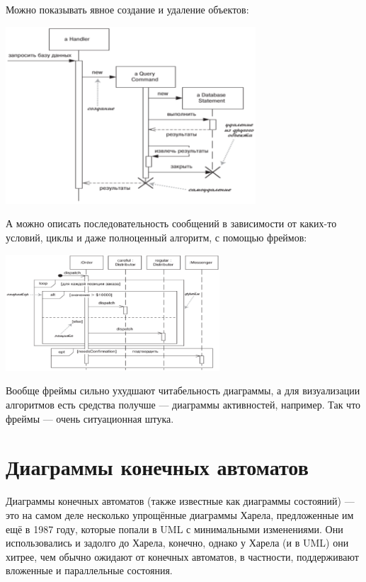 \documentclass{../mcstext}
\begin{document}
Можно показывать явное создание и удаление объектов:

\begin{center}
    \includegraphics[width=0.7\textwidth]{sequenceLifeCycle.png}
\end{center}

А можно описать последовательность сообщений в зависимости от каких-то условий, циклы и даже полноценный алгоритм, с помощью фреймов:

\begin{center}
    \includegraphics[width=0.6\textwidth]{sequenceFrames.png}
\end{center}

Вообще фреймы сильно ухудшают читабельность диаграммы, а для визуализации алгоритмов есть средства получше --- диаграммы активностей, например. Так что фреймы --- очень ситуационная штука.

\section{Диаграммы конечных автоматов}

Диаграммы конечных автоматов (также известные как диаграммы состояний) --- это на самом деле несколько упрощённые диаграммы Харела, предложенные им ещё в 1987 году, которые попали в UML с минимальными изменениями. Они использовались и задолго до Харела, конечно, однако у Харела (и в UML) они хитрее, чем обычно ожидают от конечных автоматов, в частности, поддерживают вложенные и параллельные состояния.
\end{document}
